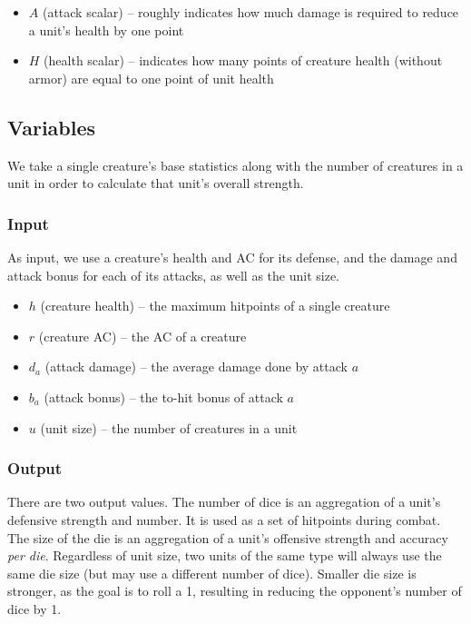 \documentclass{article}
\begin{document}
\begin{itemize}
    \item $A$ (attack scalar) -- roughly indicates how much damage is required to reduce a unit's health by one point
    \item $H$ (health scalar) -- indicates how many points of creature health (without armor) are equal to one point of unit health
\end{itemize}

\subsection{Variables}

We take a single creature's base statistics along with the number of creatures in a unit
in order to calculate that unit's overall strength.

\subsubsection{Input}

As input, we use a creature's health and AC for its defense,
and the damage and attack bonus for each of its attacks,
as well as the unit size.

\begin{itemize}
    \item $h$ (creature health) -- the maximum hitpoints of a single creature
    \item $r$ (creature AC) -- the AC of a creature
    \item $d_a$ (attack damage) -- the average damage done by attack $a$
    \item $b_a$ (attack bonus) -- the to-hit bonus of attack $a$
    \item $u$ (unit size) -- the number of creatures in a unit
\end{itemize}

\subsubsection{Output}

There are two output values.
The number of dice is an aggregation of a unit's defensive strength and number.
It is used as a set of hitpoints during combat.
The size of the die is an aggregation
of a unit's offensive strength and accuracy \emph{per die}.
Regardless of unit size,
two units of the same type will always use the same die size
(but may use a different number of dice).
Smaller die size is stronger,
as the goal is to roll a 1,
resulting in reducing the opponent's number of dice by 1.
\end{document}
